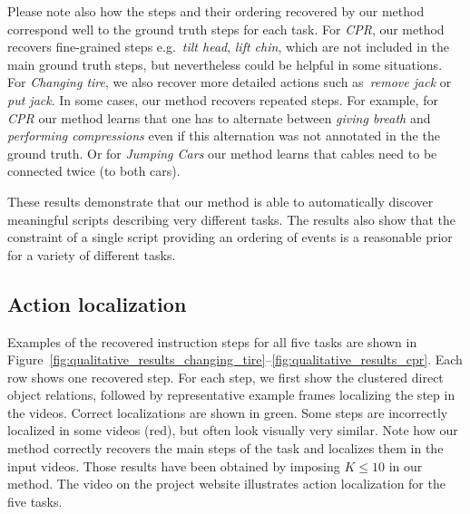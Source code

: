 \documentclass[10pt,twocolumn,letterpaper]{article}
\begin{document}
Please note also how the steps and their ordering recovered by our method correspond well to the ground truth steps for each task. 
        For {\em CPR}, our method recovers fine-grained steps e.g.~{\em tilt head}, {\em lift chin}, which are not included in the main ground truth steps, but nevertheless could be helpful in some situations.
	    For {\em Changing tire}, we also recover more detailed actions such as~{\em remove jack} or {\em put jack}.
%
%
	    In some cases, our method recovers repeated steps. %
	    For example, for {\em CPR} our method learns that one has to alternate between {\em giving breath} and {\em performing compressions} even if this alternation was not annotated in the the ground truth.
%
%
	     Or for  {\em Jumping Cars} our method learns that cables need to be connected twice (to both cars).
%
%
	    
	    These results demonstrate that our method is able to automatically discover meaningful scripts describing very different tasks.
	    The results also show that the constraint of a single script providing an ordering of events is a reasonable prior for a variety of different tasks. 
%
 
%
%

\subsection{Action localization}
\label{subsec:action_loc}
Examples of the recovered instruction steps for all five tasks are shown in Figure~\ref{fig:qualitative_results_changing_tire}--\ref{fig:qualitative_results_cpr}.
Each row shows one recovered step. 
For each step, we first show the clustered direct object relations, followed by representative example frames localizing the step in the videos. Correct localizations are shown in green. Some steps are incorrectly localized in some videos (red), but often look visually very similar.  Note how our method correctly recovers the main steps of the task and localizes them in the input videos.
Those results have been obtained by imposing $K\leq 10$ in our method.
The video on the project website illustrates action localization for the five tasks.


%

%

%
%

\newpage

\setlength{\tabcolsep}{2pt}
\end{document}
